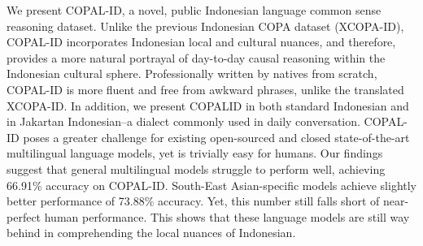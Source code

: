 We present COPAL-ID, a novel, public Indonesian language common sense reasoning dataset. Unlike the previous Indonesian COPA dataset (XCOPA-ID), COPAL-ID incorporates Indonesian local and cultural nuances, and therefore, provides a more natural portrayal of day-to-day causal reasoning within the Indonesian cultural sphere. Professionally written by natives from scratch, COPAL-ID is more fluent and free from awkward phrases, unlike the translated XCOPA-ID. In addition, we present COPALID in both standard Indonesian and in Jakartan Indonesian–a dialect commonly used in daily conversation. COPAL-ID poses a greater challenge for existing open-sourced and closed state-of-the-art multilingual language models, yet is trivially easy for humans. Our findings suggest that general multilingual models struggle to perform well, achieving 66.91\% accuracy on COPAL-ID. South-East Asian-specific models achieve slightly better performance of 73.88\% accuracy. Yet, this number still falls short of near-perfect human performance. This shows that these language models are still way behind in comprehending the local nuances of Indonesian.